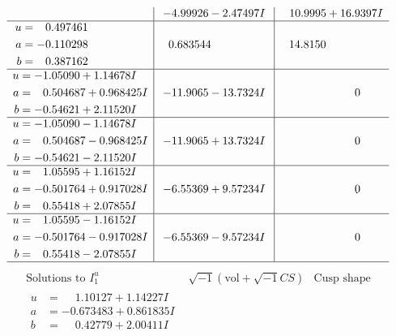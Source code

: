 \documentclass[1p]{elsarticle_modified}
\theoremstyle{definition}
\newcommand{\I}{\sqrt{-1}}
\begin{document}
$$\begin{array}{c|c|c}
 & -4.99926 - 2.47497 I & \phantom{-}10.9995 + 16.9397 I \\ \hline\begin{aligned}
u &= \phantom{-}0.497461\phantom{ +0.000000I} \\
a &= -0.110298\phantom{ +0.000000I} \\
b &= \phantom{-}0.387162\phantom{ +0.000000I}\end{aligned}
 & \phantom{-}0.683544\phantom{ +0.000000I} & \phantom{-}14.8150\phantom{ +0.000000I} \\ \hline\begin{aligned}
u &= -1.05090 + 1.14678 I \\
a &= \phantom{-}0.504687 + 0.968425 I \\
b &= -0.54621 + 2.11520 I\end{aligned}
 & -11.9065 - 13.7324 I & \phantom{-0.000000 } 0 \\ \hline\begin{aligned}
u &= -1.05090 - 1.14678 I \\
a &= \phantom{-}0.504687 - 0.968425 I \\
b &= -0.54621 - 2.11520 I\end{aligned}
 & -11.9065 + 13.7324 I & \phantom{-0.000000 } 0 \\ \hline\begin{aligned}
u &= \phantom{-}1.05595 + 1.16152 I \\
a &= -0.501764 + 0.917028 I \\
b &= \phantom{-}0.55418 + 2.07855 I\end{aligned}
 & -6.55369 + 9.57234 I & \phantom{-0.000000 } 0 \\ \hline\begin{aligned}
u &= \phantom{-}1.05595 - 1.16152 I \\
a &= -0.501764 - 0.917028 I \\
b &= \phantom{-}0.55418 - 2.07855 I\end{aligned}
 & -6.55369 - 9.57234 I & \phantom{-0.000000 } 0\\
 \hline 
 \end{array}$$\newpage$$\begin{array}{c|c|c}  
\text{Solutions to }I^u_{1}& \I (\text{vol} + \sqrt{-1}CS) & \text{Cusp shape}\\
 \hline 
\begin{aligned}
u &= \phantom{-}1.10127 + 1.14227 I \\
a &= -0.673483 + 0.861835 I \\
b &= \phantom{-}0.42779 + 2.00411 I\end{aligned}

\end{array}$$
\end{document}
